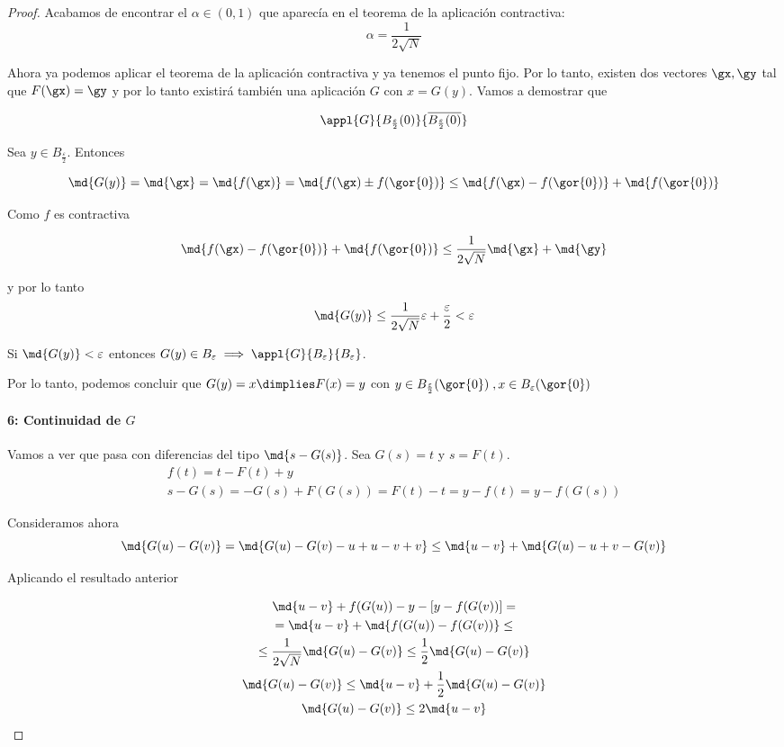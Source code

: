 \begin{proof}
  Acabamos de encontrar el $\alpha \in (0, 1)$ que aparecía en el teorema de la aplicación contractiva: \[ \alpha = \frac{1}{2\sqrt{N}} \]

  Ahora ya podemos aplicar el teorema de la aplicación contractiva y ya tenemos el punto fijo. Por lo tanto, existen dos vectores $\gx, \gy$ tal que $F(\gx) = \gy$ y por lo tanto existirá también una aplicación $G$ con $x= G(y)$. Vamos a demostrar que

  \[ \appl{G}{B_{\frac{\varepsilon}{2}}(0)}{\overline{{B_{\frac{\varepsilon}{2}}(0)}}} \]

  Sea $y \in B_{\frac{\varepsilon}{2}}$. Entonces

\[ \md{G(y)} = \md{\gx} = \md{f(\gx)} = \md{f(\gx) \pm f(\gor{0})} \leq \md{f(\gx) - f(\gor{0})} + \md{f(\gor{0})} \]

Como $f$ es contractiva

\[ \md{f(\gx) - f(\gor{0})} + \md{f(\gor{0})} \leq \frac{1}{2\sqrt{N}} \md{\gx} + \md{\gy} \]

y por lo tanto
\[ \md{G(y)} \leq \frac{1}{2\sqrt{N}}\varepsilon + \frac{\varepsilon}{2} < \varepsilon \]

  Si $\md{G(y)} < \varepsilon$ entonces  $G(y)\in B_{\varepsilon} \implies \appl{G}{B_\varepsilon}{B_\varepsilon}$.

  Por lo tanto, podemos concluir que $G(y) = x \dimplies F(x) = y$ con $y\in B_{\frac{\varepsilon}{2}}(\gor{0})\;, x \in B_{\varepsilon}(\gor{0})$

  \paragraph{6: Continuidad de $G$}


  Vamos a ver que pasa con diferencias del tipo $\md{s -G(s)}$. Sea $G(s) = t$ y $s = F(t)$.
  \begin{gather*}
  f(t) = t - F(t) + y\\
  s - G(s) = -G(s) + F(G(s)) = F(t)-t = y-f(t) = y - f(G(s))
  \end{gather*}

Consideramos ahora \[ \md{G(u)-G(v)} = \md{G(u)-G(v) -u +u-v+v} \leq \md{u-v} + \md{G(u)-u + v-G(v)} \]

Aplicando el resultado anterior

  \begin{gather*}
\md{u-v} + f(G(u)) - y - [y -f(G(v))] =\\
= \md{u-v} + \md{f(G(u)) - f(G(v))} \leq \\
\leq \frac{1}{2\sqrt{N}} \md{G(u)-G(v)} \leq \frac{1}{2}  \md{G(u)-G(v)}\\
\md{G(u)-G(v)}\leq \md{u-v} + \frac{1}{2}\md{G(u)-G(v)}\\
\md{G(u)-G(v)} \leq 2 \md{u-v}
  \end{gather*}


\end{proof}
